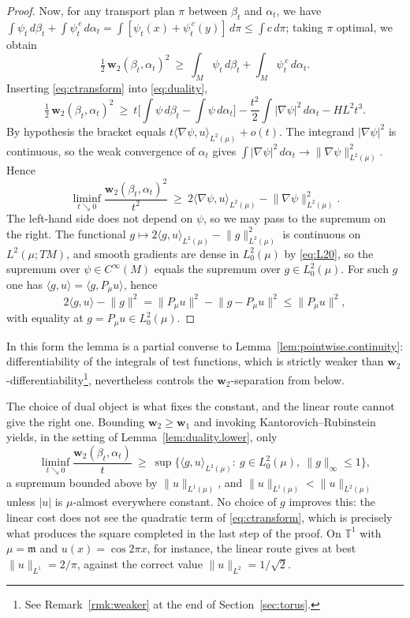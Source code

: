 \documentclass[11pt,reqno]{amsart}
\theoremstyle{plain}
\theoremstyle{definition}
\newcommand{\dw}{\mathbf{w}_2}
\newcommand{\T}{\mathbb{T}}
\newcommand{\Leb}{\mathfrak{m}}
\begin{document}
\begin{proof}
    Now, for any transport plan \( \pi \) between \( \beta_t \) and \( \alpha_t \), we have \( \int\psi_t\,d\beta_t+\int\psi_t^{\,c}\,d\alpha_t=\int[\psi_t(x)+\psi_t^{\,c}(y)]\,d\pi\le\int c\,d\pi \); taking \( \pi \) optimal, we obtain
    \begin{equation}\label{eq:duality}
        \tfrac12\,\dw(\beta_t,\alpha_t)^2\ \ge\ \int_M\psi_t\,d\beta_t+\int_M\psi_t^{\,c}\,d\alpha_t .
    \end{equation}
    Inserting \eqref{eq:ctransform} into \eqref{eq:duality},
    \[
        \tfrac12\,\dw(\beta_t,\alpha_t)^2
        \ \ge\ t\Big[\int\psi\,d\beta_t-\int\psi\,d\alpha_t\Big]
        -\frac{t^2}{2}\int\lvert\nabla\psi\rvert^2\,d\alpha_t-HL^2t^3 .
    \]
    By hypothesis the bracket equals \( t\langle\nabla\psi,u\rangle_{L^2(\mu)}+o(t) \).
    The integrand \( \lvert\nabla\psi\rvert^2 \) is continuous, so the weak convergence of \( \alpha_t \) gives \( \int\lvert\nabla\psi\rvert^2\,d\alpha_t\to\lVert\nabla\psi\rVert^2_{L^2(\mu)} \).
    Hence
    \[
        \liminf_{t\searrow0}\frac{\dw(\beta_t,\alpha_t)^2}{t^2}
        \ \ge\ 2\big\langle\nabla\psi,u\big\rangle_{L^2(\mu)}-\big\lVert\nabla\psi\big\rVert^2_{L^2(\mu)} .
    \]
    The left-hand side does not depend on \( \psi \), so we may pass to the supremum on the right.
    The functional \( g\mapsto2\langle g,u\rangle_{L^2(\mu)}-\lVert g\rVert^2_{L^2(\mu)} \) is continuous on \( L^2(\mu;TM) \), and smooth gradients are dense in \( L^2_0(\mu) \) by \eqref{eq:L20}, so the supremum over \( \psi\in C^\infty(M) \) equals the supremum over \( g\in L^2_0(\mu) \).
    For such \( g \) one has \( \langle g,u\rangle=\langle g,P_\mu u\rangle \), hence
    \[
        2\langle g,u\rangle-\lVert g\rVert^2=\lVert P_\mu u\rVert^2-\lVert g-P_\mu u\rVert^2\le\lVert P_\mu u\rVert^2 ,
    \]
    with equality at \( g=P_\mu u\in L^2_0(\mu) \).
\end{proof}

In this form the lemma is a partial converse to Lemma~\ref{lem:pointwise.continuity}: differentiability of the integrals of test functions, which is strictly weaker than \(\dw\)-differentiability\footnote{
		See Remark~\ref{rmk:weaker} at the end of Section~\ref{sec:torus}.
}, nevertheless controls the \(\dw\)-separation from below.

The choice of dual object is what fixes the constant, and the linear route cannot give the right one.
Bounding \( \dw\ge\mathbf w_1 \) and invoking Kantorovich--Rubinstein yields, in the setting of Lemma~\ref{lem:duality.lower}, only
\[
    \liminf_{t\searrow0}\frac{\dw(\beta_t,\alpha_t)}{t}\ \ge\ \sup\big\{\langle g,u\rangle_{L^2(\mu)}:\ g\in L^2_0(\mu),\ \lVert g\rVert_\infty\le1\big\},
\]
a supremum bounded above by \( \lVert u\rVert_{L^1(\mu)} \), and \( \lVert u\rVert_{L^1(\mu)}<\lVert u\rVert_{L^2(\mu)} \) unless \( \lvert u\rvert \) is \( \mu \)-almost everywhere constant.
No choice of \( g \) improves this: the linear cost does not see the quadratic term of \eqref{eq:ctransform}, which is precisely what produces the square completed in the last step of the proof.
On \( \T^1 \) with \( \mu=\Leb \) and \( u(x)=\cos2\pi x \), for instance, the linear route gives at best \( \lVert u\rVert_{L^1}=2/\pi \), against the correct value \( \lVert u\rVert_{L^2}=1/\sqrt2 \).
\end{document}
